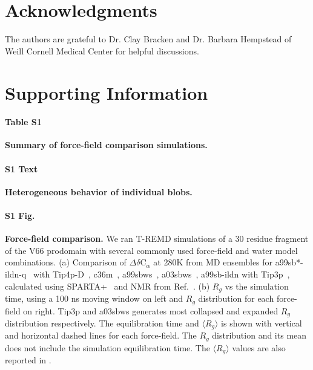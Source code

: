 \documentclass[10pt,letterpaper]{article}
\begin{document}
\section*{Acknowledgments}
The authors are grateful to Dr. Clay Bracken and Dr. Barbara Hempstead of Weill Cornell Medical Center for helpful discussions.

\section*{Supporting Information}

\paragraph*{Table S1}
\label{S1_Table}
{\bf Summary of force-field comparison simulations.}

\paragraph*{S1 Text}
\label{S1_Text}
{\bf Heterogeneous behavior of individual blobs.} 

\paragraph*{S1 Fig.}
\label{S1_Fig}
{\bf Force-field comparison.} We ran T-REMD simulations of a 30 residue fragment of the V66 prodomain with several commonly used force-field and water model combinations. (a) Comparison of $\Delta$$\delta$C$_{\alpha}$ at 280K from MD ensembles for a99sb*-ildn-q~\cite{Lindorff-Larsen2010a, Hornak2006a} with Tip4p-D~\cite{Piana2015}, c36m~\cite{Huang2016a}, a99sbws~\cite{Lindorff-Larsen2010a, Best2014}, a03sbws~\cite{Best2009, Best2014}, a99sb-ildn with Tip3p~\cite{Jorgensen1981}, calculated using SPARTA+~\cite{Shen2010} and NMR from Ref.~\cite{Anastasia2013}. (b) $R_g$ vs the simulation time, using a 100 ns moving window on left and $R_g$ distribution for each force-field on right. Tip3p and a03sbws generates most collapsed and expanded $R_g$ distribution respectively. The equilibration time and $\langle R_g \rangle$ is shown with vertical and horizontal dashed lines for each force-field. The $R_g$ distribution and its mean does not include the simulation equilibration time. The $\langle R_g \rangle$ values are also reported in .
\end{document}
